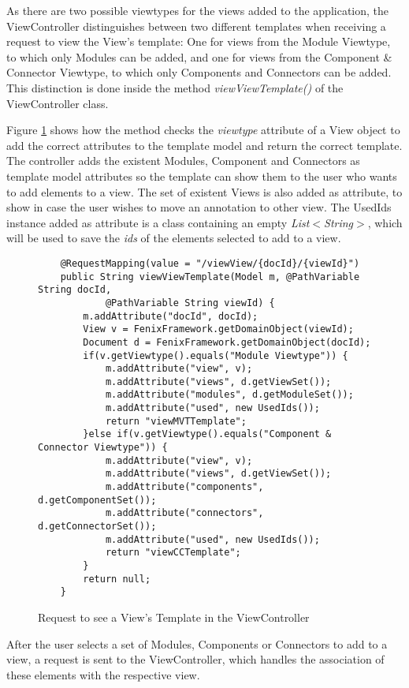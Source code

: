 As there are two possible viewtypes for the views added to the application, the ViewController distinguishes between two different templates when receiving a request to view the View's template: One for views from the Module Viewtype, to which only Modules can be added, and one for views from the Component \& Connector Viewtype, to which only Components and Connectors can be added. This distinction is done inside the method \textit{viewViewTemplate()} of the ViewController class. 

Figure \ref{figure:ViewControllerViewTemplates} shows how the method checks the \textit{viewtype} attribute of a View object to add the correct attributes to the template model and return the correct template. The controller adds the existent Modules, Component and Connectors as template model attributes so the template can show them to the user who wants to add elements to a view. The set of existent Views is also added as attribute, to show in case the user wishes to move an annotation to other view. The UsedIds instance added as attribute is a class containing an empty \textit{List$<$String$>$}, which will be used to save the \textit{ids} of the elements selected to add to a view. 

\begin{figure}[h]
\lstset{style=customjava}
\begin{lstlisting}
	@RequestMapping(value = "/viewView/{docId}/{viewId}")
	public String viewViewTemplate(Model m, @PathVariable String docId,
			@PathVariable String viewId) {
		m.addAttribute("docId", docId);
		View v = FenixFramework.getDomainObject(viewId);
		Document d = FenixFramework.getDomainObject(docId);
		if(v.getViewtype().equals("Module Viewtype")) {
			m.addAttribute("view", v);
			m.addAttribute("views", d.getViewSet());
			m.addAttribute("modules", d.getModuleSet());
			m.addAttribute("used", new UsedIds());
			return "viewMVTTemplate";
		}else if(v.getViewtype().equals("Component & Connector Viewtype")) {
			m.addAttribute("view", v);
			m.addAttribute("views", d.getViewSet());
			m.addAttribute("components", d.getComponentSet());
			m.addAttribute("connectors", d.getConnectorSet());
			m.addAttribute("used", new UsedIds());
			return "viewCCTemplate";
		}
		return null;
	}	
\end{lstlisting}
\caption{Request to see a View's Template in the ViewController}
\label{figure:ViewControllerViewTemplates}
\end{figure}

After the user selects a set of Modules, Components or Connectors to add to a view, a request is sent to the ViewController, which handles the association of these elements with the respective view.

